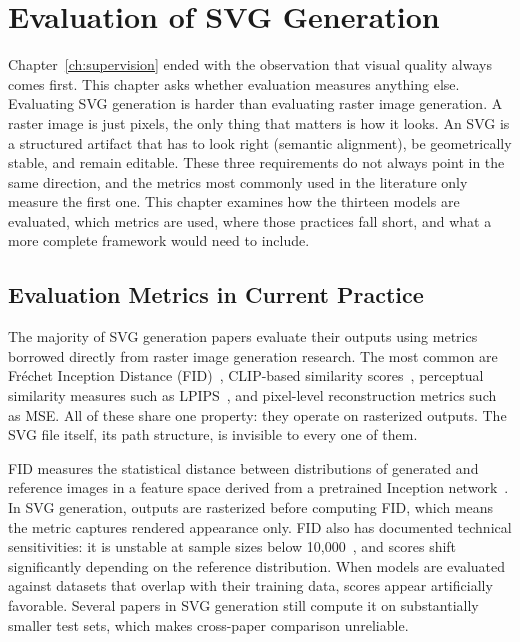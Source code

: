 \chapter{Evaluation of SVG Generation}
\label{ch:Evaluation}

Chapter~\ref{ch:supervision} ended with the observation that visual quality 
always comes first. This chapter asks whether evaluation measures anything else.
Evaluating SVG generation is harder than evaluating raster 
image generation. A raster image is just pixels, the only thing that matters is how it looks.
An SVG is a structured artifact 
that has to look right (semantic alignment), be geometrically stable, and remain 
editable. These three requirements do not always point in 
the same direction, and the metrics most commonly used in 
the literature only measure the first one. 
This chapter examines how the thirteen models are evaluated, which metrics are used, where those practices 
fall short, and what a more complete framework would need 
to include.

\section{Evaluation Metrics in Current Practice}
\label{sec:current_eval}

The majority of SVG generation papers evaluate their outputs 
using metrics borrowed directly from raster image generation 
research. The most common are Fréchet Inception Distance 
(FID)~\cite{heuselGANsTrainedTwo2017}, CLIP-based similarity 
scores~\cite{radfordLearningTransferableVisual2021}, 
perceptual similarity measures such as 
LPIPS~\cite{zhangUnreasonableEffectivenessDeep2018}, 
and pixel-level reconstruction metrics such as MSE.
All of these share one property: they 
operate on rasterized outputs. The SVG file itself, its 
path structure, is invisible to every one of them.

FID measures the statistical distance between 
distributions of generated and reference images in a feature 
space derived from a pretrained Inception 
network~\cite{szegedy2016rethinking}. In SVG generation, outputs 
are rasterized before computing FID, which means the metric 
captures rendered appearance only. FID also has documented 
technical sensitivities: it is unstable at sample sizes below 
10,000~\cite{heuselGANsTrainedTwo2017}, and scores shift 
significantly depending on the reference distribution. When 
models are evaluated against datasets that overlap with their 
training data, scores appear artificially favorable. Several papers 
in SVG generation still compute it on substantially 
smaller test sets, which makes cross-paper comparison unreliable.


